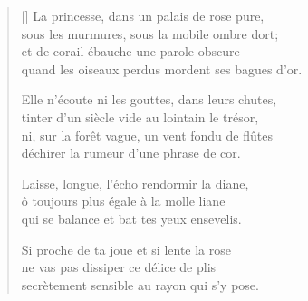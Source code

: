 {\itshape
\begin{verse}[\versewidth]
  La princesse, dans un palais de rose pure, \\
  sous les murmures, sous la mobile ombre dort; \\
  et de corail ébauche une parole obscure \\
  quand les oiseaux perdus mordent ses bagues d'or.

  Elle n'écoute ni les gouttes, dans leurs chutes, \\
  tinter d'un siècle vide au lointain le trésor, \\
  ni, sur la forêt vague, un vent fondu de flûtes \\
  déchirer la rumeur d'une phrase de cor.

  Laisse, longue, l'écho rendormir la diane, \\
  ô toujours plus égale à la molle liane \\
  qui se balance et bat tes yeux ensevelis.

  Si proche de ta joue et si lente la rose \\
  ne vas pas dissiper ce délice de plis \\
  secrètement sensible au rayon qui s'y pose.
\end{verse}
}
